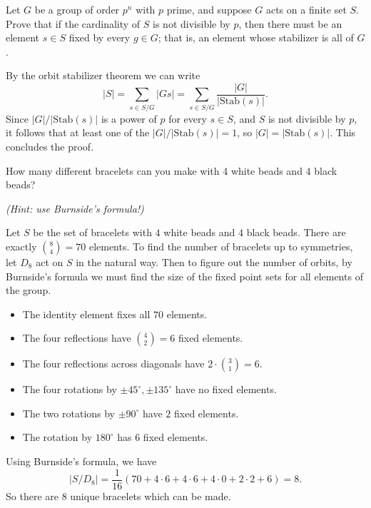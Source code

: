 \documentclass[11pt,letterpaper]{article}
\begin{document}
\pagebreak
\begin{problem}
Let $G$ be a group of order $p^n$ with $p$ prime, and suppose $G$ acts on a finite set $S$. Prove that if the cardinality of $S$ is not divisible by $p$, then there must be an element $s \in S$ fixed by every $g \in G$; that is, an element whose stabilizer is all of $G$.
\end{problem}

By the orbit stabilizer theorem we can write
\[
  |S|=\sum_{s\in S/G}|Gs|=\sum_{s\in S/G}\frac{|G|}{|\mathrm{Stab}(s)|}
.\]
Since $|G|/|\mathrm{Stab}(s)|$ is a power of $p$  for every $s\in S$, and $S$ is not divisible by $p$,  it follows that at least one of the $|G|/|\mathrm{Stab}(s)|=1$, so $|G|=|\mathrm{Stab}(s)|$. This concludes the proof.  

\pagebreak
\begin{problem}
How many different bracelets can you make with 4 white beads and 4 black beads?
\end{problem}
\textit{(Hint: use Burnside's formula!)}

Let $S$ be the set of bracelets with $4$ white beads and $4$ black beads. There are exactly $\binom{8}{4}=70$ elements. To find the number of bracelets up to symmetries, let $D_8$ act on $S$ in the natural way. Then to figure out the number of orbits, by Burnside's formula we must find the size of the fixed point sets for all elements of the group.
\begin{itemize}
  \item The identity element fixes all $70$ elements.
  \item The four reflections have $\binom{4}{2}=6$ fixed elements.
  \item The four reflections across diagonals have $2\cdot\binom{3}{1}=6$. 
  \item The four rotations by $\pm 45^\circ, \pm 135^\circ$ have no fixed elements.
  \item The two rotations by $\pm 90^\circ$ have $2$ fixed elements.
  \item The rotation by $180^\circ$ has $6$ fixed elements.  
\end{itemize}    

Using Burnside's formula, we have
\[
  |S/D_8|=\frac{1}{16}(70+4\cdot 6+4\cdot 6+4\cdot 0 + 2\cdot 2+6)=8
.\] 
So there are $8$ unique bracelets which can be made.
\end{document}
